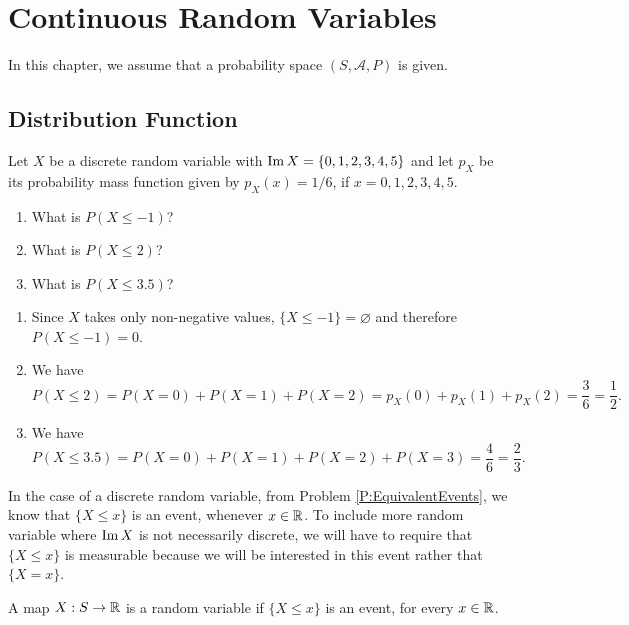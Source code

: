\chapter{Continuous Random Variables}

In this chapter, we assume that a probability space $(S, \mathcal{A}, P)$ is given.

\section{Distribution Function}

\begin{example}
Let $X$ be a discrete random variable with $\operatorname{Im} X = \{ 0, 1, 2, 3, 4, 5 \}$ and let $p_X$ be its probability mass function given by $p_X (x) = 1/6$, if $x = 0, 1, 2, 3, 4, 5$.
    \begin{enumerate}[label=\alph*)]
        \item What is $P (X \leq -1 )$?
        \item What is $P (X \leq 2 )$?
        \item What is $P (X \leq 3.5 )$?
    \end{enumerate}
\end{example}
\begin{sol*}
\begin{enumerate}[label=\alph*)]
    \item Since $X$ takes only non-negative values, $\{ X \leq -1 \} = \varnothing$ and therefore $P (X \leq -1) = 0$.
    \item We have
        \[
            P (X \leq 2) = P (X = 0) + P (X = 1) + P (X = 2) = p_X (0) + p_X (1) + p_X (2) = \frac{3}{6} = \frac{1}{2} .
        \]
    \item We have 
        \[
            P (X \leq 3.5 ) = P (X = 0) + P (X = 1) + P (X = 2) + P (X = 3) = \frac{4}{6} = \frac{2}{3} .
        \]
\end{enumerate}
\end{sol*}

In the case of a discrete random variable, from Problem \ref{P:EquivalentEvents}, we know that $\{ X \leq x \}$ is an event, whenever $x \in \mathbb{R}$. To include more random variable where $\operatorname{Im} X$ is not necessarily discrete, we will have to require that $\{X \leq x \}$ is measurable because we will be interested in this event rather that $\{ X = x \}$. 

\begin{definition}
A map $X : S \rightarrow \mathbb{R}$ is a random variable if $\{ X \leq x \}$ is an event, for every $x \in \mathbb{R}$.
\end{definition}


